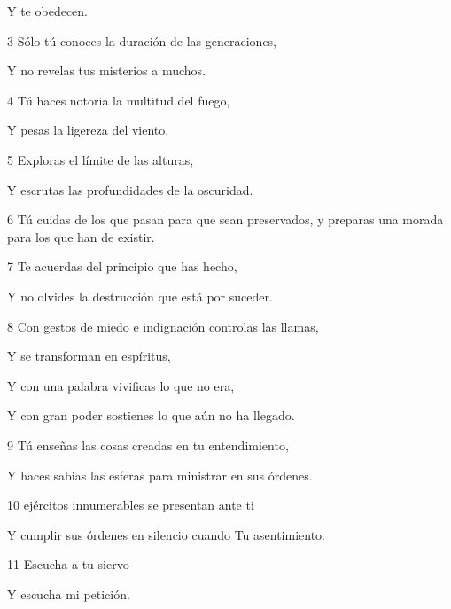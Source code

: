 \par Y te obedecen.

\par 3 Sólo tú conoces la duración de las generaciones,

\par Y no revelas tus misterios a muchos.

\par 4 Tú haces notoria la multitud del fuego,

\par Y pesas la ligereza del viento.

\par 5 Exploras el límite de las alturas,

\par Y escrutas las profundidades de la oscuridad.

\par 6 Tú cuidas de los que pasan para que sean preservados, y preparas una morada para los que han de existir.

\par 7 Te acuerdas del principio que has hecho,

\par Y no olvides la destrucción que está por suceder.

\par 8 Con gestos de miedo e indignación controlas las llamas,

\par Y se transforman en espíritus,

\par Y con una palabra vivificas lo que no era,

\par Y con gran poder sostienes lo que aún no ha llegado.

\par 9 Tú enseñas las cosas creadas en tu entendimiento,

\par Y haces sabias las esferas para ministrar en sus órdenes.

\par 10 ejércitos innumerables se presentan ante ti

\par Y cumplir sus órdenes en silencio cuando Tu asentimiento.

\par 11 Escucha a tu siervo

\par Y escucha mi petición.

